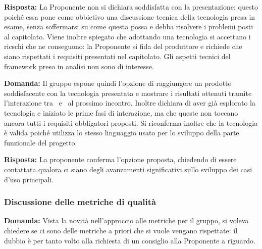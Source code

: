 \par \textbf{Risposta:} La Proponente non si dichiara soddisfatta con la presentazione; questo poiché essa pone come obbietivo una discussione tecnica della tecnologia presa in esame, senza soffermarsi su come questa possa e debba risolvere i problemi posti al capitolato. 
Viene inoltre spiegato che adottando una tecnologia si accettano i ricschi che ne conseguono: la Proponente si fida del produttore e richiede che siano rispettati i requisiti presentati nel capitolato. 
Gli aspetti tecnici del framework preso in analisi non sono di interesse.

\par \textbf{Domanda:} Il gruppo espone quindi l'opzione di raggiungere un prodotto soddisfacente con la tecnologia presentata e mostrare i risultati ottenuti tramite l'interazione tra \ e \ al prossimo incontro. 
Inoltre dichiara di aver già esplorato la tecnologia e iniziato le prime fasi di interazione, ma che queste non toccano ancora tutti i requisiti obbligatori proposti. 
Si riconferma inoltre che la tecnologia è valida poiché utilizza lo stesso linguaggio usato per lo sviluppo della parte funzionale del progetto.

\par \textbf{Risposta:} La proponente conferma l'opzione proposta, chiedendo di essere contattata qualora ci siano degli avanzamenti significativi sullo sviluppo dei casi d'uso principali.

\subsubsection{Discussione delle metriche di qualità}

\par \textbf{Domanda:} Vista la novità nell'approccio alle metriche per il gruppo, si voleva chiedere se ci sono delle metriche a priori che si vuole vengano rispettate: il dubbio è per tanto volto alla richiesta di un consiglio alla Proponente a riguardo.

